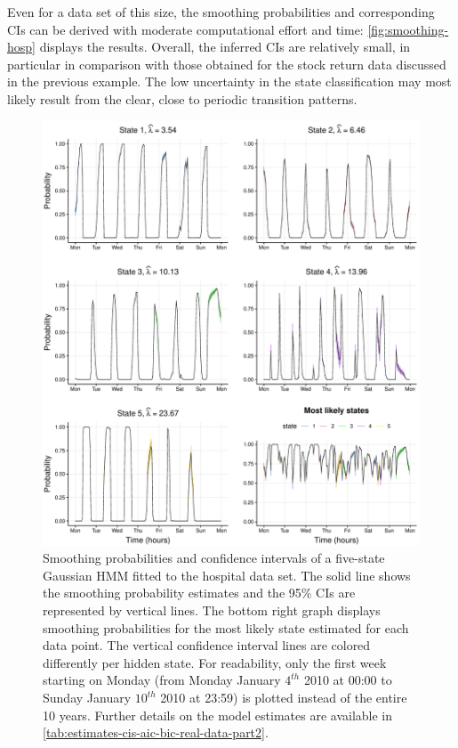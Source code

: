 \documentclass[]{interact}\usepackage[]{graphicx}\usepackage[dvipsnames]{xcolor}
\makeatletter
\def\maxwidth{ %
  \ifdim\Gin@nat@width>\linewidth
    \linewidth
  \else
    \Gin@nat@width
  \fi
}
\newenvironment{knitrout}{}{} %
\theoremstyle{plain}%
\theoremstyle{definition}
\theoremstyle{remark}
\makeatother
\begin{document}
Even for a data set of this size, the smoothing probabilities and corresponding CIs can be derived with moderate computational effort and time: \autoref{fig:smoothing-hosp} displays the results.
Overall, the inferred CIs are relatively small, in particular in comparison with those obtained for the stock return data discussed in the previous example.
The low uncertainty in the state classification may most likely result from the clear, close to periodic transition patterns.

\begin{knitrout}
\color{fgcolor}\begin{figure}[!htb]

{\centering \includegraphics[width=\maxwidth]{figure/smoothing-hosp-1} 

}

\caption{Smoothing probabilities and confidence intervals of a five-state Gaussian HMM fitted to the hospital data set. The solid line shows the smoothing probability estimates and the 95\% CIs are represented by vertical lines. The bottom right graph displays smoothing probabilities for the most likely state estimated for each data point. The vertical confidence interval lines are colored differently per hidden state. For readability, only the first week starting on Monday (from Monday January $4^{th}$ 2010 at 00:00 to Sunday January $10^{th}$ 2010 at 23:59) is plotted instead of the entire 10 years. Further details on the model estimates are available in \autoref{tab:estimates-cis-aic-bic-real-data-part2}.}\label{fig:smoothing-hosp}
\end{figure}

\end{knitrout}
\end{document}
